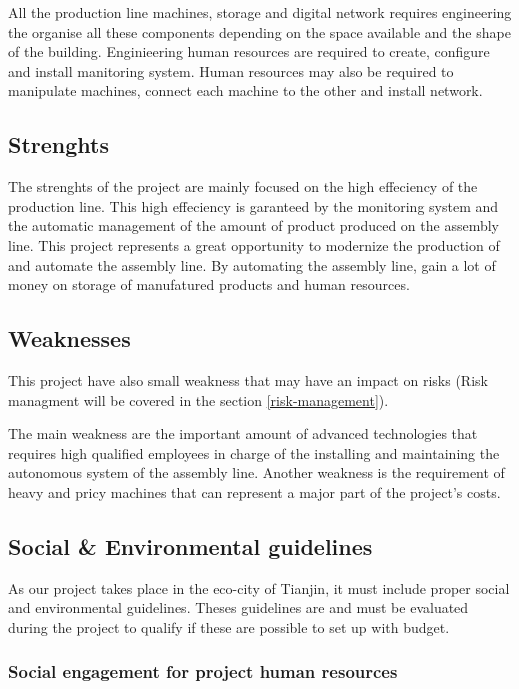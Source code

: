 All the production line machines, storage and digital network requires engineering the organise all these components depending on the space available and the shape of the building.
Enginieering human resources are required to create, configure and install manitoring system.
Human resources may also be required to manipulate machines, connect each machine to the other and install network.

\subsection{Strenghts}

The strenghts of the project are mainly focused on the high effeciency of the production line.
This high effeciency is garanteed by the monitoring system and the automatic management of the amount of product produced on the assembly line.
This project represents a great opportunity to modernize the production of \moldco and automate the assembly line.
By automating the assembly line, \moldco gain a lot of money on storage of manufatured products and human resources.

\subsection{Weaknesses}

This project have also small weakness that may have an impact on risks
(Risk managment will be covered in the section \ref{risk-management}).

The main weakness are the important amount of advanced technologies that requires high qualified employees in charge of the installing and maintaining the autonomous system of the assembly line.
Another weakness is the requirement of heavy and pricy machines that can represent a major part of the project's costs.

\subsection{Social \& Environmental guidelines}

As our project takes place in the eco-city of Tianjin, it must include proper social and environmental guidelines.
Theses guidelines are and must be evaluated during the project to qualify if these are possible to set up with \moldco budget.

\subsubsection{Social engagement for project human resources}


